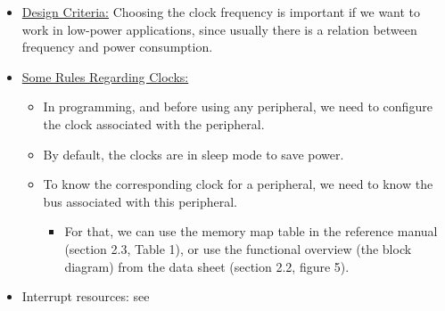 \begin{itemize}


\item \underline{Design Criteria:} Choosing the clock frequency is important if we want to work in low-power applications, since usually there is a relation between frequency and power consumption.

\item \underline{Some Rules Regarding Clocks:}

\begin{itemize}
    
    \item In programming, and before using any peripheral, we need to configure the clock associated with the peripheral.

    \item By default, the clocks are in sleep mode to save power.

    \item To know the corresponding clock for a peripheral, we need to know the bus associated with this peripheral.

    \begin{itemize}
        \item For that, we can use the memory map table in the reference manual (section 2.3, Table 1), or use the functional overview (the block diagram) from the data sheet (section 2.2, figure 5).
    \end{itemize}
    
\end{itemize}

\item Interrupt resources: see 

\end{itemize}